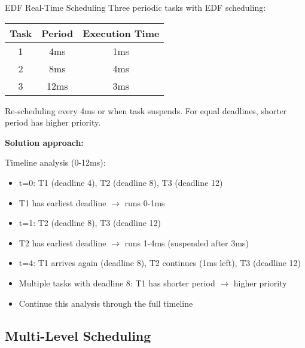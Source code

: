 \begin{example2}{EDF Real-Time Scheduling}
    Three periodic tasks with EDF scheduling:
    
    \begin{tabular}{|c|c|c|}
        \hline
        Task & Period & Execution Time \\
        \hline
        1 & 4ms & 1ms \\
        2 & 8ms & 4ms \\
        3 & 12ms & 3ms \\
        \hline
    \end{tabular}
    
    Re-scheduling every 4ms or when task suspends.
    For equal deadlines, shorter period has higher priority.
    
    \tcblower
    
    \textbf{Solution approach:}
    
    Timeline analysis (0-12ms):
    \begin{itemize}
        \item t=0: T1 (deadline 4), T2 (deadline 8), T3 (deadline 12)
        \item T1 has earliest deadline $\rightarrow$ runs 0-1ms
        \item t=1: T2 (deadline 8), T3 (deadline 12)  
        \item T2 has earliest deadline $\rightarrow$ runs 1-4ms (suspended after 3ms)
        \item t=4: T1 arrives again (deadline 8), T2 continues (1ms left), T3 (deadline 12)
        \item Multiple tasks with deadline 8: T1 has shorter period $\rightarrow$ higher priority
        \item Continue this analysis through the full timeline
    \end{itemize}
\end{example2}

\raggedcolumns
\columnbreak

\subsection{Multi-Level Scheduling}

